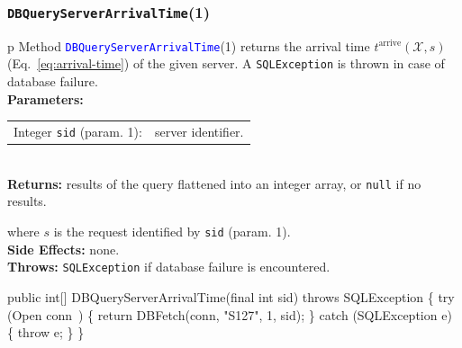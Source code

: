 \documentclass{article}
\def\nwendcode{\endtrivlist \endgroup}      %
\let\nwdocspar=\par
\theoremstyle{definition}                   %
\begin{document}
\subsubsection{{\tt{}\protect{}DBQueryServerArrivalTime}(1)}
\begin{tabular}{p{\textwidth}}
\toprule
{}
Method \textcolor{blue}{{\tt{}\protect{}DBQueryServerArrivalTime}}(1) returns the
arrival time $t^\textrm{arrive}(\mathcal{X},s)$
(Eq.~\ref{eq:arrival-time}) of the given server.
A {\tt{}SQLException} is thrown in case of database failure.\\
\midrule
\textbf{Parameters:}\\
\begin{tabular}{lp{116mm}}
Integer {\tt{}sid} (param. 1):&server identifier.
\end{tabular}\\
\textbf{Returns:} results of the query flattened into an integer array,
or {\tt{}null} if no results.


where $s$ is the request identified by {\tt{}sid} (param. 1).\\
\textbf{Side Effects:} none.\\
\textbf{Throws:} {\tt{}SQLException} if database failure is encountered.\\
\bottomrule
\end{tabular}
\nwenddocs{}\plusendmoddef
public int[] DBQueryServerArrivalTime(final int sid) throws SQLException \{
  try (\LA{}Open \code{}conn\edoc{}~{\nwtagstyle{}}\RA{}) \{
    return DBFetch(conn, "S127", 1, sid);
  \} catch (SQLException e) \{
    throw e;
  \}
\}
\eatline
{}\nwendcode{}\nwdocspar
\end{document}
